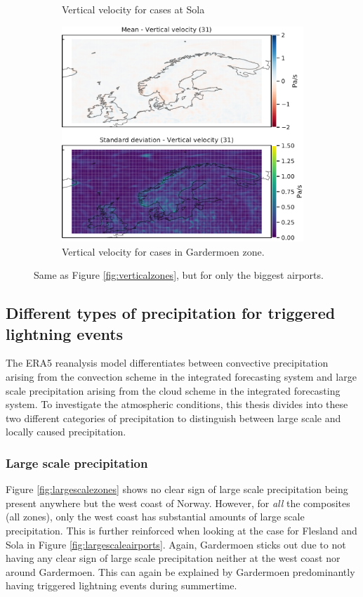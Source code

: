 \begin{figure}[H]
\begin{subfigure}[b]{0.49\textwidth}
         \caption{Vertical velocity for cases at Sola}
         \label{fig:ENZVW}
     \end{subfigure}
    \begin{subfigure}[b]{0.5\textwidth}
    \centering
    \includegraphics[width=\textwidth]{Figures/WENGM.pdf}
    \caption{Vertical velocity for cases in Gardermoen zone.}
    \label{fig:ENGMW}
\end{subfigure}
\caption{Same as Figure \ref{fig:verticalzones}, but for only the biggest airports.}
\label{fig:verticalairports}
\end{figure}


\subsection{Different types of precipitation for triggered lightning events}
The ERA5 reanalysis model differentiates between convective precipitation arising from the convection scheme in the integrated forecasting system and large scale precipitation arising from the cloud scheme in the integrated forecasting system. To investigate the atmospheric conditions, this thesis divides into these two different categories of precipitation to distinguish between large scale and locally caused precipitation.

\subsubsection{Large scale precipitation}
Figure \ref{fig:largescalezones} shows no clear sign of large scale precipitation being present anywhere but the west coast of Norway. However, for \textit{all} the composites (all zones), only the west coast has substantial amounts of large scale precipitation. This is further reinforced when looking at the case for Flesland and Sola in Figure \ref{fig:largescaleairports}. Again, Gardermoen sticks out due to not having any clear sign of large scale precipitation neither at the west coast nor around Gardermoen. This can again be explained by Gardermoen predominantly having triggered lightning events during summertime.

